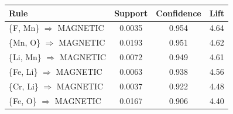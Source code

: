 \begin{tabular}{lccc}
\toprule
Rule & Support & Confidence & Lift\\
\midrule
\{F, Mn\} $\Rightarrow$ MAGNETIC & 0.0035 & 0.954 & 4.64 \\
\{Mn, O\} $\Rightarrow$ MAGNETIC & 0.0193 & 0.951 & 4.62 \\
\{Li, Mn\} $\Rightarrow$ MAGNETIC & 0.0072 & 0.949 & 4.61 \\
\{Fe, Li\} $\Rightarrow$ MAGNETIC & 0.0063 & 0.938 & 4.56 \\
\{Cr, Li\} $\Rightarrow$ MAGNETIC & 0.0037 & 0.922 & 4.48 \\
\{Fe, O\} $\Rightarrow$ MAGNETIC & 0.0167 & 0.906 & 4.40 \\
\bottomrule
\end{tabular}
